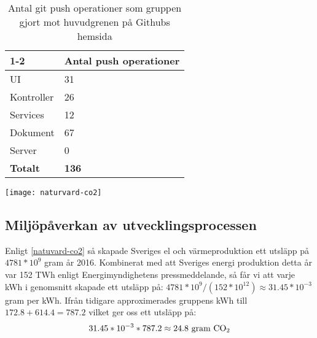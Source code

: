 \begin{table}
	\centering
	\begin{tabular}{| l | l |}
		\cline{1-2}
		\multicolumn{1}{| c |}{\textbf{Gitrepo}} & \textbf{Antal push operationer}\\ \hline
		UI & 31 \\ \hline
		Kontroller & 26 \\ \hline
		Services & 12 \\ \hline
		Dokument & 67 \\ \hline
		Server & 0 \\ \hline
		\textbf{Totalt} & \textbf{136} \\ \hline
	\end{tabular}
	\caption{Antal git push operationer som gruppen gjort mot huvudgrenen på Githubs hemsida}
	\label{tab:github_results_table}
\end{table}



\begin{figure*}[h]
	\texttt{[image: naturvard-co2]}
	\caption{Statistik ifrån naturvårdsverket}
	\label{natuvard-co2}
\end{figure*}


\subsection{Miljöpåverkan av utvecklingsprocessen}
Enligt \ref{natuvard-co2} så skapade Sveriges el och värmeproduktion ett  utsläpp på $4781*10^9$ gram år 2016. Kombinerat med att Sveriges energi produktion detta år var 152 TWh enligt Energimyndighetens pressmeddelande\cite{elprod2016}, så får vi att varje kWh i genomsnitt skapade ett utsläpp på: $4781*10^9 / (152 * 10^{12}) \approx 31.45 * 10^{-3}$ gram  per kWh. Ifrån tidigare approximerades gruppens kWh till $172.8 + 614.4 = 787.2$ vilket ger oss ett  utsläpp på: $$31.45 * 10^{-3} * 787.2 \approx 24.8 \text{ gram \ce{CO2}}$$
